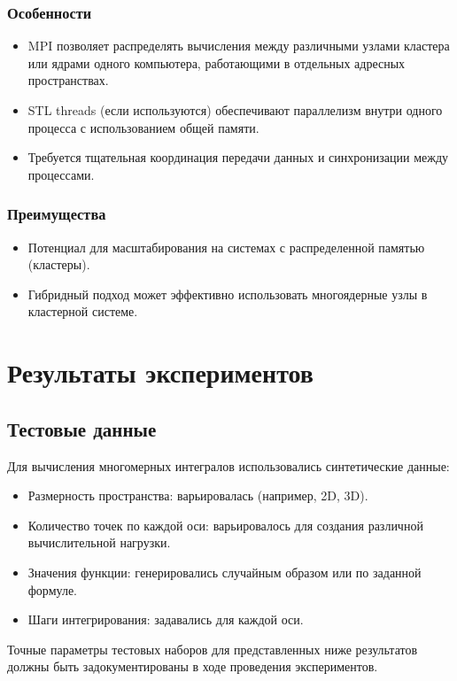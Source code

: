 \documentclass[12pt]{article}
\begin{document}
\subsubsection*{Особенности}
\begin{itemize}
  \item MPI позволяет распределять вычисления между различными узлами кластера или ядрами одного компьютера, работающими в отдельных адресных пространствах.
  \item STL threads (если используются) обеспечивают параллелизм внутри одного процесса с использованием общей памяти.
  \item Требуется тщательная координация передачи данных и синхронизации между процессами.
\end{itemize}

\subsubsection*{Преимущества}
\begin{itemize}
  \item Потенциал для масштабирования на системах с распределенной памятью (кластеры).
  \item Гибридный подход может эффективно использовать многоядерные узлы в кластерной системе.
\end{itemize}

\section{Результаты экспериментов}
\subsection*{Тестовые данные}
Для вычисления многомерных интегралов использовались синтетические данные:
\begin{itemize}
  \item Размерность пространства: варьировалась (например, 2D, 3D).
  \item Количество точек по каждой оси: варьировалось для создания различной вычислительной нагрузки.
  \item Значения функции: генерировались случайным образом или по заданной формуле.
  \item Шаги интегрирования: задавались для каждой оси.
\end{itemize}
Точные параметры тестовых наборов для представленных ниже результатов должны быть задокументированы в ходе проведения экспериментов.
\end{document}
